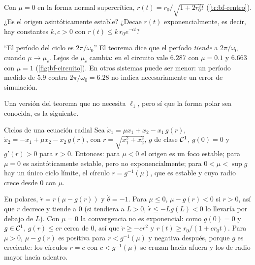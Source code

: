 \begin{pausa}
Con $\mu=0$ en la forma normal supercrítica, $r(t)=r_0/\sqrt{1+2r_0^2t}$ (\cref{tr:bf-centro}). ¿Es el origen asintóticamente estable? ¿Decae $r(t)$ exponencialmente, es decir, hay constantes $k,c>0$ con $r(t)\le k\,r_0e^{-ct}$?
\end{pausa}

\begin{trampa}[label=tr:bf-periodo]{``El período del ciclo es $2\pi/\omega_0$''}
El teorema dice que el período \emph{tiende} a $2\pi/\omega_0$ cuando $\mu\to\mu_c$. Lejos de $\mu_c$ cambia: en el circuito vale $6.287$ con $\mu=0.1$ y $6.663$ con $\mu=1$ (\cref{fig:bf-circuito}). En otros sistemas puede ser menor: un período medido de $5.9$ contra $2\pi/\omega_0=6.28$ no indica necesariamente un error de simulación.
\end{trampa}

Una versión del teorema que no necesita $\ell_1$, pero sí que la forma polar sea conocida, es la siguiente.

\begin{proposicion}[label=prop:bf-radial]{Ciclos de una ecuación radial}
Sea $\dot x_1=\mu x_1+x_2-x_1\,g(r)$, $\dot x_2=-x_1+\mu x_2-x_2\,g(r)$, con $r=\sqrt{x_1^2+x_2^2}$, $g$ de clase $\mathcal{C}^{1}$, $g(0)=0$ y $g'(r)>0$ para $r>0$. Entonces: para $\mu<0$ el origen es un foco estable; para $\mu=0$ es asintóticamente estable, pero no exponencialmente; para $0<\mu<\sup g$ hay un único ciclo límite, el círculo $r=g^{-1}(\mu)$, que es estable y cuyo radio crece desde $0$ con $\mu$.
\end{proposicion}

\begin{demostracion}
En polares, $\dot r=r(\mu-g(r))$ y $\dot\theta=-1$. Para $\mu\le0$, $\mu-g(r)<0$ si $r>0$, así que $r$ decrece y tiende a $0$ (si tendiera a $L>0$, $\dot r\le-Lg(L)<0$ lo llevaría por debajo de $L$). Con $\mu=0$ la convergencia no es exponencial: como $g(0)=0$ y $g\in\mathcal{C}^{1}$, $g(r)\le cr$ cerca de $0$, así que $\dot r\ge-cr^2$ y $r(t)\ge r_0/(1+cr_0t)$. Para $\mu>0$, $\mu-g(r)$ es positiva para $r<g^{-1}(\mu)$ y negativa después, porque $g$ es creciente: los círculos $r=c$ con $c<g^{-1}(\mu)$ se cruzan hacia afuera y los de radio mayor hacia adentro.
\end{demostracion}

